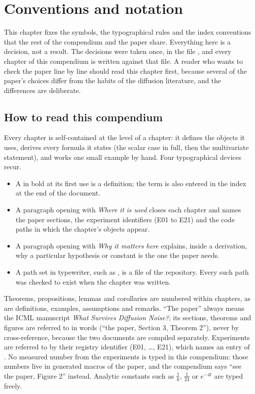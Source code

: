 \chapter{Conventions and notation}
\label{ch:conventions}

\newcommand{\cvMac}[1]{\texttt{\textbackslash #1}}

This chapter fixes the symbols, the typographical rules and the index conventions
that the rest of the compendium and the paper share. Everything here is a decision,
not a result. The decisions were taken once, in the file ,
and every chapter of this compendium is written against that file. A reader who
wants to check the paper line by line should read this chapter first, because several
of the paper's choices differ from the habits of the diffusion literature, and the
differences are deliberate.

\section{How to read this compendium}

Every chapter is self-contained at the level of a chapter: it defines the objects it
uses, derives every formula it states (the scalar case in full, then the multivariate
statement), and works one small example by hand. Four typographical devices recur.

\begin{itemize}
\item A  in bold at its first use is a definition; the term is also entered
  in the index at the end of the document.
\item A paragraph opening with \emph{Where it is used} closes each chapter and names
  the paper sections, the experiment identifiers (E01 to E21) and the code paths in
  which the chapter's objects appear.
\item A paragraph opening with \emph{Why it matters here} explains, inside a
  derivation, why a particular hypothesis or constant is the one the paper needs.
\item A path set in typewriter, such as , is a file
  of the repository. Every such path was checked to exist when the chapter was written.
\end{itemize}

Theorems, propositions, lemmas and corollaries are numbered within chapters, as are
definitions, examples, assumptions and remarks. ``The paper'' always means the ICML
manuscript \emph{What Survives Diffusion Noise?}; its sections, theorems and figures
are referred to in words (``the paper, Section 3, Theorem 2''), never by cross-reference,
because the two documents are compiled separately. Experiments are referred to by
their registry identifier (E01, \dots, E21), which names an entry of
. No measured number from the experiments is typed in this
compendium: those numbers live in generated macros of the paper, and the compendium
says ``see the paper, Figure 2'' instead. Analytic constants such as $\tfrac16$,
$\tfrac1{24}$ or $e^{-4t}$ are typed freely.

